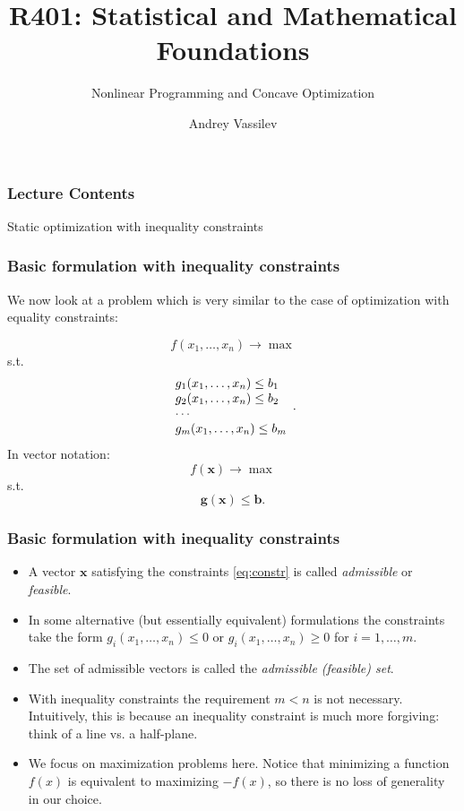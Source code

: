 \documentclass[10pt]{beamer}
\title{R401: Statistical and Mathematical Foundations \bigskip}
\subtitle{\textcolor{myred}{Nonlinear Programming and Concave Optimization}}
\author{Andrey Vassilev}
\date{}
\theoremstyle{definition}
\begin{document}
\maketitle



\begin{frame}[fragile]
\frametitle{Lecture Contents}
\tableofcontents
\end{frame}

\begin{section}{Static optimization with inequality constraints}\label{sec:ineq}

\begin{frame}[fragile]
\frametitle{Basic formulation with inequality constraints}
We now look at a problem which is very similar to the case of optimization with equality constraints:

\begin{equation}
f(x_1,\ldots,x_n)\rightarrow \max 
\label{eq:obj}
\end{equation}
s.t.
\begin{equation}
\begin{array}{l l l}
g_1(x_1,\ldots,x_n) \leq b_1\\
g_2(x_1,\ldots,x_n) \leq b_2\\
\cdots \\
g_m(x_1,\ldots,x_n) \leq b_m\\
\end{array}.
\label{eq:constr}
\end{equation}
In vector notation:
\[ f(\mathbf{x}) \rightarrow \max \]
s.t. \[ \mathbf{g}(\mathbf{x})\leq \mathbf{b}. \]
\end{frame}

\begin{frame}[fragile]
\frametitle{Basic formulation with inequality constraints}
\begin{itemize}
\item A vector $ \mathbf{x} $ satisfying the constraints \eqref{eq:constr} is called \emph{admissible} or \emph{feasible}.\bigskip
\item In some alternative (but essentially equivalent) formulations the constraints take the form
$ g_i(x_1,\ldots,x_n)\leq 0 $ or $ g_i(x_1,\ldots,x_n)\geq 0 $ for $ i=1,\ldots,m $.\bigskip
\item The set of admissible vectors is called the \emph{admissible (feasible) set}.\bigskip
\item With inequality constraints the requirement $ m<n $ is not necessary. Intuitively, this is because an inequality constraint is much more forgiving: think of a line vs. a half-plane.\bigskip
\item We focus on maximization problems here. Notice that minimizing a function $ f(x) $ is equivalent to maximizing $ -f(x) $, so there is no loss of generality in our choice.
\end{itemize}
\end{frame}


\end{section}
\end{document}
